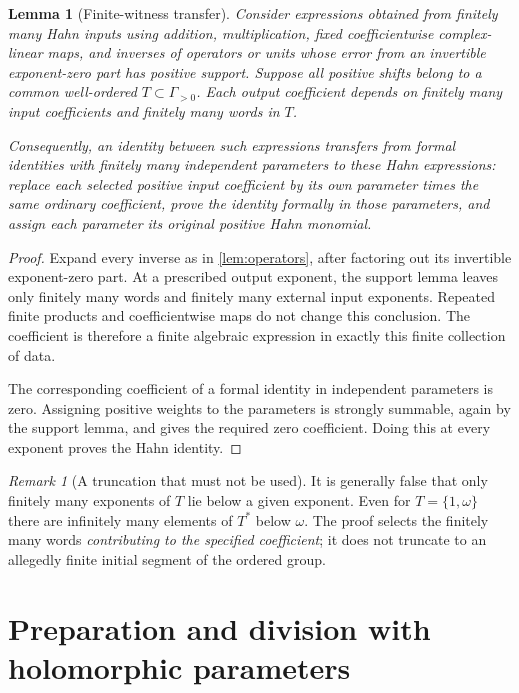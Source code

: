 \documentclass[11pt,letterpaper]{article}
\newtheorem{lemma}[theorem]{Lemma}
\theoremstyle{definition}
\theoremstyle{remark}
\newtheorem{remark}[theorem]{Remark}
\begin{document}
\begin{lemma}[Finite-witness transfer]\label{lem:witness}
Consider expressions obtained from finitely many Hahn inputs using addition, multiplication, fixed coefficientwise complex-linear maps, and inverses of operators or units whose error from an invertible exponent-zero part has positive support. Suppose all positive shifts belong to a common well-ordered $T\subset\Gamma_{>0}$. Each output coefficient depends on finitely many input coefficients and finitely many words in $T$.

Consequently, an identity between such expressions transfers from formal identities with finitely many independent parameters to these Hahn expressions: replace each selected positive input coefficient by its own parameter times the same ordinary coefficient, prove the identity formally in those parameters, and assign each parameter its original positive Hahn monomial.
\end{lemma}
\begin{proof}
Expand every inverse as in \cref{lem:operators}, after factoring out its invertible exponent-zero part. At a prescribed output exponent, the support lemma leaves only finitely many words and finitely many external input exponents. Repeated finite products and coefficientwise maps do not change this conclusion. The coefficient is therefore a finite algebraic expression in exactly this finite collection of data.

The corresponding coefficient of a formal identity in independent parameters is zero. Assigning positive weights to the parameters is strongly summable, again by the support lemma, and gives the required zero coefficient. Doing this at every exponent proves the Hahn identity.
\end{proof}

\begin{remark}[A truncation that must not be used]
It is generally false that only finitely many exponents of $T$ lie below a given exponent. Even for $T=\{1,\omega\}$ there are infinitely many elements of $T^*$ below $\omega$. The proof selects the finitely many words \emph{contributing to the specified coefficient}; it does not truncate to an allegedly finite initial segment of the ordered group.
\end{remark}

\section{Preparation and division with holomorphic parameters}
\label{sec:preparation}
\end{document}
